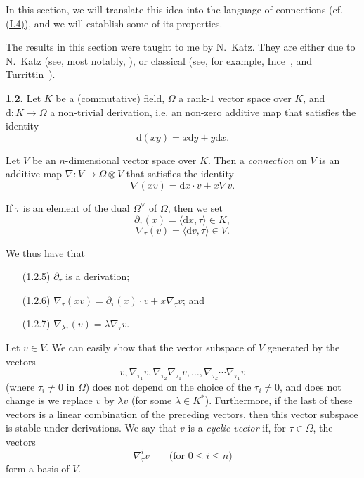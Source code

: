 \documentclass{report}
\newenvironment{rmenv}[1]
  {\phantomsection\par\medskip\noindent\textbf{#1.}\rmfamily}
  {\medskip}
\newcommand{\dd}{\mathrm{d}}
\renewcommand{\leq}{\leqslant}
\newcommand{\oldpage}[1]{\marginpar{\footnotesize$\Big\vert$ \textit{p.~#1}}}
\begin{document}
In this section, we will translate this idea into the language of connections (cf. \hyperref[I.4]{(I.4)}), and we will establish some of its properties.

The results in this section were taught to me by N.~Katz.
They are either due to N.~Katz (see, most notably, \cite{14,15}), or classical (see, for example, Ince~\cite{13}, and Turrittin~\cite{25,26}).

\begin{rmenv}{1.2}
\label{II.1.2}
  Let $K$ be a (commutative) field, $\Omega$ a rank-$1$ vector space over $K$, and $\dd\colon K\to\Omega$ a non-trivial derivation, i.e. an non-zero additive map that satisfies the identity
  \[
  \label{II.1.2.1}
    \dd(xy) = x\dd y + y\dd x.
  \tag{1.2.1}
  \]

  Let $V$ be an $n$-dimensional vector space over $K$.
  Then a \emph{connection} on $V$ is an additive map $\nabla\colon V\to\Omega\otimes V$ that satisfies the identity
  \[
  \label{II.1.2.2}
    \nabla(xv) = \dd x\cdot v + x\nabla v.
  \tag{1.2.2}
  \]

  If $\tau$ is an element of the dual $\Omega^\vee$ of $\Omega$, then we set
  \[
  \label{II.1.2.3}
    \partial_\tau(x) = \langle\dd x,\tau\rangle \in K,
  \tag{1.2.3}
  \]
  \[
  \label{II.1.2.4}
    \nabla_\tau(v) = \langle\dd v,\tau\rangle \in V.
  \tag{1.2.4}
  \]

\oldpage{42}
  We thus have that
  \begin{enumerate}
    \item[(1.2.5)] \label{II.1.2.5}
      $\partial_\tau$ is a derivation;
    \item[(1.2.6)] \label{II.1.2.6}
      $\nabla_\tau(xv) = \partial_\tau(x)\cdot v + x\nabla_\tau v$; and
    \item[(1.2.7)] \label{II.1.2.7}
      $\nabla_{\lambda\tau}(v) = \lambda\nabla_\tau v$.
  \end{enumerate}

  Let $v\in V$.
  We can easily show that the vector subspace of $V$ generated by the vectors
  \[
    v, \nabla_{\tau_1}v, \nabla_{\tau_2}\nabla_{\tau_1}v, \ldots, \nabla_{\tau_k}\cdots\nabla_{\tau_1} v
  \]
  (where $\tau_i\neq0$ in $\Omega$) does not depend on the choice of the $\tau_i\neq0$, and does not change is we replace $v$ by $\lambda v$ (for some $\lambda\in K^*$).
  Furthermore, if the last of these vectors is a linear combination of the preceding vectors, then this vector subspace is stable under derivations.
  We say that $v$ is a \emph{cyclic vector} if, for $\tau\in\Omega$, the vectors
  \[
    \nabla_\tau^i v
    \qquad\mbox{(for $0\leq i\leq n$)}
  \]
  form a basis of $V$.
\end{rmenv}
\end{document}

